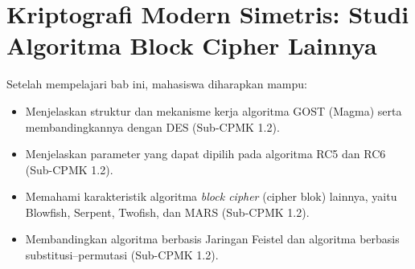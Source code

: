 \documentclass[../../main.tex]{subfiles}
\begin{document}
\chapter{Kriptografi Modern Simetris: Studi Algoritma Block Cipher Lainnya}
\label{chap:block-cipher-lainnya}

\begin{learningoutcome}
Setelah mempelajari bab ini, mahasiswa diharapkan mampu:
\begin{itemize}
    \item Menjelaskan struktur dan mekanisme kerja algoritma GOST (Magma) serta membandingkannya dengan DES (Sub-CPMK 1.2).
    \item Menjelaskan parameter yang dapat dipilih pada algoritma RC5 dan RC6 (Sub-CPMK 1.2).
    \item Memahami karakteristik algoritma \textit{block cipher} (cipher blok) lainnya, yaitu Blowfish, Serpent, Twofish, dan MARS (Sub-CPMK 1.2).
    \item Membandingkan algoritma berbasis Jaringan Feistel dan algoritma berbasis substitusi--permutasi (Sub-CPMK 1.2).
\end{itemize}
\end{learningoutcome}









\end{document}
